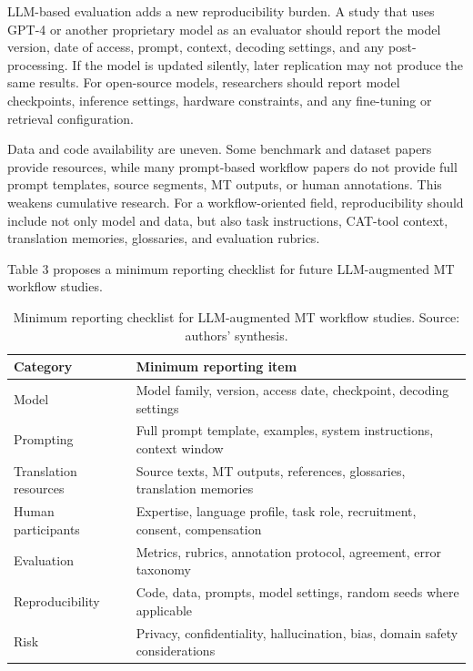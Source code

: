 \documentclass[11pt]{article}
\begin{document}
LLM-based evaluation adds a new reproducibility burden. A study that uses GPT-4 or another proprietary model as an evaluator should report the model version, date of access, prompt, context, decoding settings, and any post-processing. If the model is updated silently, later replication may not produce the same results. For open-source models, researchers should report model checkpoints, inference settings, hardware constraints, and any fine-tuning or retrieval configuration.

Data and code availability are uneven. Some benchmark and dataset papers provide resources, while many prompt-based workflow papers do not provide full prompt templates, source segments, MT outputs, or human annotations. This weakens cumulative research. For a workflow-oriented field, reproducibility should include not only model and data, but also task instructions, CAT-tool context, translation memories, glossaries, and evaluation rubrics.

Table 3 proposes a minimum reporting checklist for future LLM-augmented MT workflow studies.

\begin{table}[t]
\centering
\caption{Minimum reporting checklist for LLM-augmented MT workflow studies. Source: authors' synthesis.}
\small
\begin{tabularx}{\textwidth}{>{\RaggedRight\arraybackslash}p{2.7cm}>{\RaggedRight\arraybackslash}X}
\toprule
Category & Minimum reporting item \\
\midrule
Model & Model family, version, access date, checkpoint, decoding settings \\
Prompting & Full prompt template, examples, system instructions, context window \\
Translation resources & Source texts, MT outputs, references, glossaries, translation memories \\
Human participants & Expertise, language profile, task role, recruitment, consent, compensation \\
Evaluation & Metrics, rubrics, annotation protocol, agreement, error taxonomy \\
Reproducibility & Code, data, prompts, model settings, random seeds where applicable \\
Risk & Privacy, confidentiality, hallucination, bias, domain safety considerations \\
\bottomrule
\end{tabularx}
\end{table}
\end{document}
